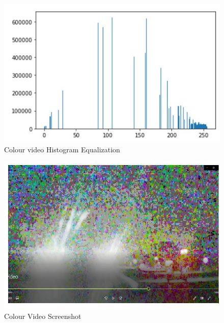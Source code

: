 \documentclass[12pt]{report}
\begin{document}
{\begin{figure}[h!]
    \centering
    \includegraphics[scale=0.4]{Capture5.JPG}
    \caption{Colour video Histogram Equalization}
    \label{fig:my_label2}
\end{figure}
\begin{figure}[h!]
    \centering
    \includegraphics[scale=0.4]{Capture6.JPG}
    \caption{Colour Video Screenshot}
    \label{fig:my_label2}
\end{figure}





}
\end{document}
